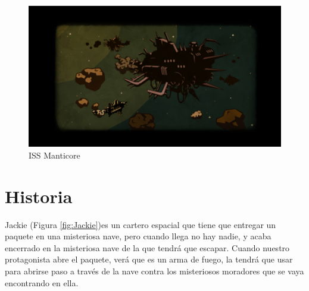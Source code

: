 \begin{figure}[H]
	\centering
	\includegraphics[scale=0.80]{imagenes/2.png}	
	\caption{\label{fig:ISSManticore}ISS Manticore}
\end{figure}

\section{Historia}
Jackie (Figura \ref{fig:Jackie})es un cartero espacial que tiene que entregar un paquete en una misteriosa nave, pero cuando llega no hay nadie, y acaba encerrado en la misteriosa nave de la que tendrá que escapar. Cuando nuestro protagonista abre el paquete, verá que es un arma de fuego, la tendrá que usar para abrirse paso a través de la nave contra los misteriosos moradores que se vaya encontrando en ella.

